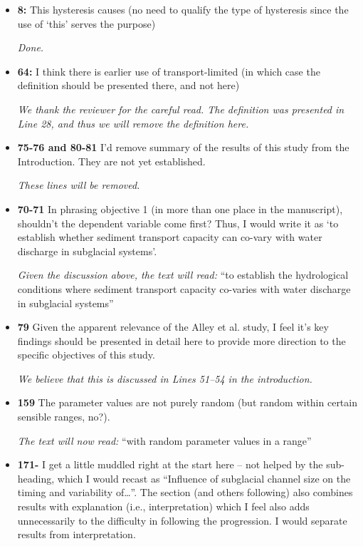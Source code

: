 \documentclass[11pt]{article}
\begin{document}
\begin{itemize}
  
\item \textbf{8:} This hysteresis causes (no need to qualify the type of hysteresis since the
  use of ‘this’ serves the purpose)

  \textit{Done.}

  
\item \textbf{64:} I think there is earlier use of transport-limited (in which case the definition
  should be presented there, and not here)

  \textit{We thank the reviewer for the careful read. The definition was presented in Line 28, and thus we will remove the definition here.}


\item \textbf{75-76 and 80-81} I’d remove summary of the results of this study from the Introduction. They
  are not yet established.

  \textit{These lines will be removed.}

\item \textbf{70-71} In phrasing objective 1 (in more than one place in the manuscript),
  shouldn’t the dependent variable come first? Thus, I would write it as ‘to
  establish whether sediment transport capacity can co-vary with water
  discharge in subglacial systems’.

  \textit{Given the discussion above, the text will read:} ``to establish the hydrological conditions where  sediment transport capacity co-varies with water discharge in subglacial systems''
  
\item \textbf{79} Given the apparent relevance of the Alley et al. study, I feel it’s key findings
  should be presented in detail here to provide more direction to the specific
  objectives of this study.

  \textit{ We believe that this is discussed in Lines 51--54 in the introduction.}


  
\item \textbf{159} The parameter values are not purely random (but random within certain
  sensible ranges, no?).

  \textit{The text will now read:} ``with random parameter values in a range''

\item \textbf{171-} I get a little muddled right at the start here – not helped by the sub-heading,
  which I would recast as “Influence of subglacial channel size on the timing
  and variability of…”. The section (and others following) also combines
  results with explanation (i.e., interpretation) which I feel also adds
  unnecessarily to the difficulty in following the progression. I would separate
  results from interpretation.


\end{itemize}
\end{document}
